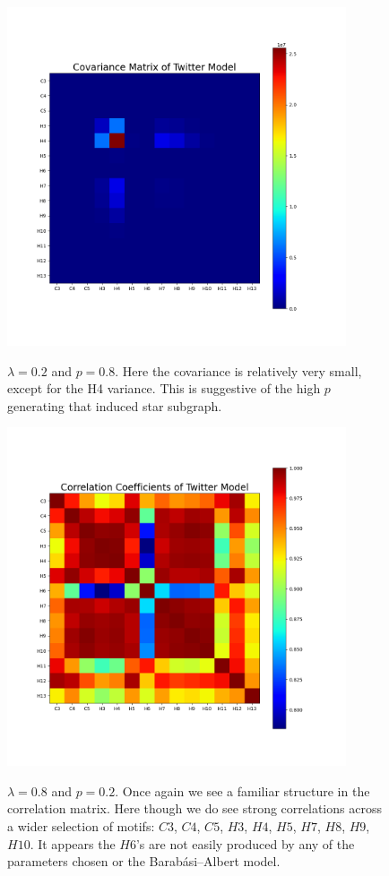 \begin{figure}
    \includegraphics[width=10cm]{Images/CovMatTwitterModel020809.png}\
    \centering
    \caption{$\lambda=0.2$ and $p=0.8$. Here the covariance is relatively 
    very small, except for the H4 variance. This is suggestive of 
    the high $p$ generating that induced star subgraph.}
\end{figure}

\begin{figure}
    \includegraphics[width=10cm]{Images/CorrCoefTwitterModel080209.png}\
    \centering
    \caption{$\lambda=0.8$ and $p=0.2$. Once again we see a familiar structure
    in the correlation matrix. Here though we do see strong correlations 
    across a wider selection of motifs: $C3$, $C4$, $C5$, $H3$, $H4$, $H5$, $H7$, $H8$, $H9$, $H10$. It appears
    the $H6$'s are not easily produced by any of the parameters chosen or the 
    Barabási–Albert model.}
\end{figure}

